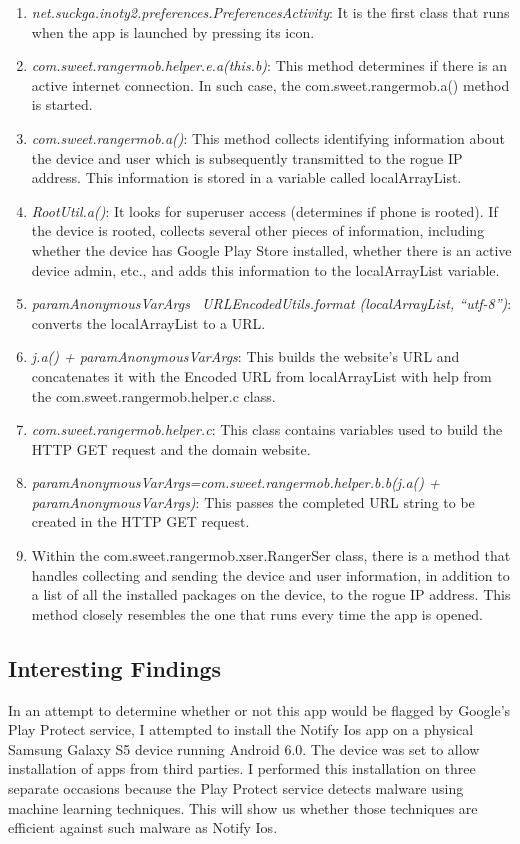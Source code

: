 \documentclass[conference]{IEEEtran}
\begin{document}
\begin{enumerate}
\item \emph{net.suckga.inoty2.preferences.PreferencesActivity}: It is the first class that runs when the app is launched by pressing its icon.
\item \emph{com.sweet.rangermob.helper.e.a(this.b)}: This method determines if there is an active internet connection. In such case, the com.sweet.rangermob.a() method is started.
\item \emph{com.sweet.rangermob.a()}: This method collects identifying information about the device and user which is subsequently transmitted to the rogue IP address. This information is stored in a variable called localArrayList.
\item \emph{RootUtil.a()}: It looks for superuser access (determines if phone is rooted).
If the device is rooted, collects several other pieces of information, including whether the device has Google Play Store installed, whether there is an active device admin, etc., and adds this information to the localArrayList variable.
\item \emph{paramAnonymousVarArgs \ URLEncodedUtils.format (localArrayList, “utf-8”)}: converts the localArrayList to a URL.
\item \emph{j.a() + paramAnonymousVarArgs}: This builds the website’s URL and concatenates it with the Encoded URL from localArrayList with help from the com.sweet.rangermob.helper.c class. 
\item \emph{com.sweet.rangermob.helper.c}: This class contains variables used to build the HTTP GET request and the domain website.
\item \emph{paramAnonymousVarArgs=com.sweet.rangermob.helper.b.b(j.a() + paramAnonymousVarArgs)}: This passes the completed URL string to be created in the HTTP GET request.
\item Within the com.sweet.rangermob.xser.RangerSer class, there is a method that handles collecting and sending the device and user information, in addition to a list of all the installed packages on the device, to the rogue IP address. This method closely resembles the one that runs every time the app is opened.
\end{enumerate}
\subsection{Interesting Findings}
In an attempt to determine whether or not this app would be flagged by Google’s Play Protect service, I attempted to install the Notify Ios app on a physical Samsung Galaxy S5 device running Android 6.0. The device was set to allow installation of apps from third parties. I performed this installation on three separate occasions because the Play Protect service detects malware using machine learning techniques. This will show us whether those techniques are efficient against such malware as Notify Ios.
\end{document}
